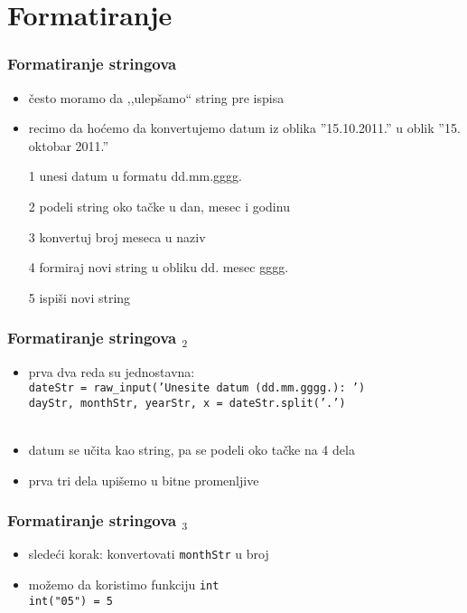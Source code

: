 \documentclass[utf8,compress]{beamer}
\begin{document}
\section{Formatiranje}

\begin{frame}[fragile]
  \frametitle{Formatiranje stringova}
  \begin{itemize}
    \item često moramo da ,,ulepšamo`` string pre ispisa
    \item recimo da hoćemo da konvertujemo datum iz oblika ''15.10.2011.'' u oblik ''15. oktobar 2011.''
    \item[1] unesi datum u formatu dd.mm.gggg.
    \item[2] podeli string oko tačke u dan, mesec i godinu
    \item[3] konvertuj broj meseca u naziv
    \item[4] formiraj novi string u obliku dd. mesec gggg.
    \item[5] ispiši novi string
  \end{itemize}
\end{frame}

\begin{frame}[fragile]
  \frametitle{Formatiranje stringova $_2$}
  \begin{itemize}
    \item prva dva reda su jednostavna: \\
      \texttt{dateStr = raw\_input('Unesite datum (dd.mm.gggg.): ')} \\
      \texttt{dayStr, monthStr, yearStr, x = dateStr.split('.')} \\ \ \\ %
    \item datum se učita kao string, pa se podeli oko tačke na 4 dela
    \item prva tri dela upišemo u bitne promenljive
  \end{itemize}
\end{frame}

\begin{frame}[fragile]
  \frametitle{Formatiranje stringova $_3$}
  \begin{itemize}
    \item sledeći korak: konvertovati \texttt{monthStr} u broj
    \item možemo da koristimo funkciju \texttt{int} \\
      \texttt{int("05") = 5}
  \end{itemize}
\end{frame}
\end{document}

